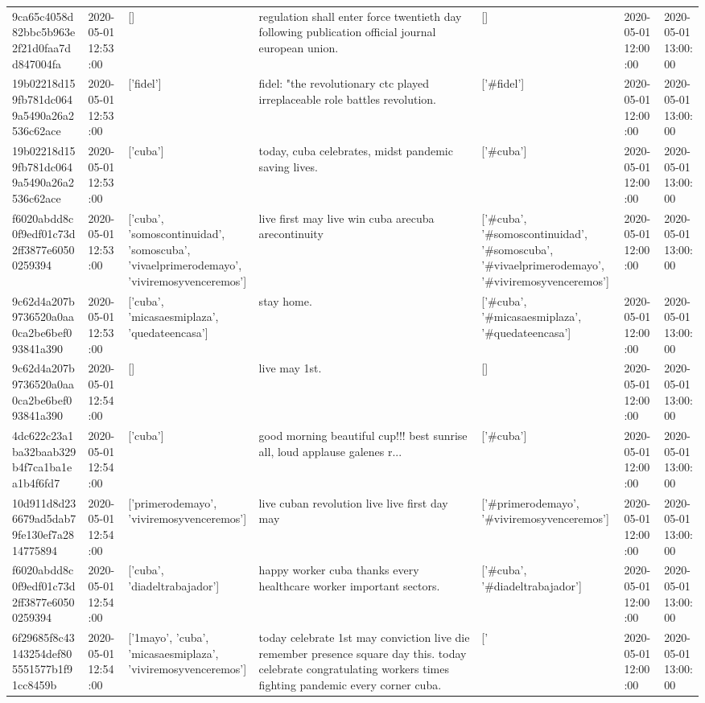 \begin{tabular}{lllllll}
9ca65c4058d82bbc5b963e2f21d0faa7dd847004fa & 2020-05-01 12:53:00 & [] & regulation shall enter force twentieth day following publication official journal european union. & [] & 2020-05-01 12:00:00 & 2020-05-01 13:00:00 \\
19b02218d159fb781dc0649a5490a26a2536c62ace & 2020-05-01 12:53:00 & ['fidel'] & fidel: "the revolutionary ctc played irreplaceable role battles revolution. & ['#fidel'] & 2020-05-01 12:00:00 & 2020-05-01 13:00:00 \\
19b02218d159fb781dc0649a5490a26a2536c62ace & 2020-05-01 12:53:00 & ['cuba'] & today, cuba celebrates, midst pandemic saving lives. & ['#cuba'] & 2020-05-01 12:00:00 & 2020-05-01 13:00:00 \\
f6020abdd8c0f9edf01c73d2ff3877e60500259394 & 2020-05-01 12:53:00 & ['cuba', 'somoscontinuidad', 'somoscuba', 'vivaelprimerodemayo', 'viviremosyvenceremos'] & live first may live win cuba arecuba arecontinuity & ['#cuba', '#somoscontinuidad', '#somoscuba', '#vivaelprimerodemayo', '#viviremosyvenceremos'] & 2020-05-01 12:00:00 & 2020-05-01 13:00:00 \\
9c62d4a207b9736520a0aa0ca2be6bef093841a390 & 2020-05-01 12:53:00 & ['cuba', 'micasaesmiplaza', 'quedateencasa'] & stay home. & ['#cuba', '#micasaesmiplaza', '#quedateencasa'] & 2020-05-01 12:00:00 & 2020-05-01 13:00:00 \\
9c62d4a207b9736520a0aa0ca2be6bef093841a390 & 2020-05-01 12:54:00 & [] & live may 1st. & [] & 2020-05-01 12:00:00 & 2020-05-01 13:00:00 \\
4dc622c23a1ba32baab329b4f7ca1ba1ea1b4f6fd7 & 2020-05-01 12:54:00 & ['cuba'] & good morning beautiful cup!!! best sunrise all, loud applause galenes r... & ['#cuba'] & 2020-05-01 12:00:00 & 2020-05-01 13:00:00 \\
10d911d8d236679ad5dab79fe130ef7a2814775894 & 2020-05-01 12:54:00 & ['primerodemayo', 'viviremosyvenceremos'] & live cuban revolution live live first day may & ['#primerodemayo', '#viviremosyvenceremos'] & 2020-05-01 12:00:00 & 2020-05-01 13:00:00 \\
f6020abdd8c0f9edf01c73d2ff3877e60500259394 & 2020-05-01 12:54:00 & ['cuba', 'diadeltrabajador'] & happy worker cuba thanks every healthcare worker important sectors. & ['#cuba', '#diadeltrabajador'] & 2020-05-01 12:00:00 & 2020-05-01 13:00:00 \\
6f29685f8c43143254def805551577b1f91cc8459b & 2020-05-01 12:54:00 & ['1mayo', 'cuba', 'micasaesmiplaza', 'viviremosyvenceremos'] & today celebrate 1st may conviction live die remember presence square day this. today celebrate congratulating workers times fighting pandemic every corner cuba. & ['#1mayo', '#cuba', '#micasaesmiplaza', '#viviremosyvenceremos'] & 2020-05-01 12:00:00 & 2020-05-01 13:00:00 \\

\end{tabular}
